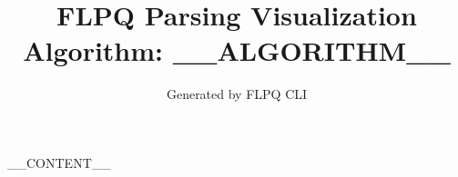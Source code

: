 \documentclass[12pt]{article}
\title{FLPQ Parsing Visualization\\Algorithm: __ALGORITHM__}
\author{Generated by FLPQ CLI}
\date{}
\begin{document}
\maketitle
\tableofcontents

__CONTENT__
\end{document}
